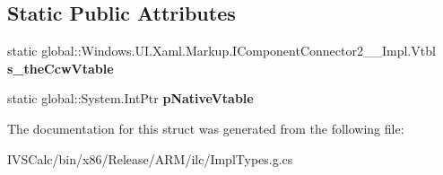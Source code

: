 \subsection*{Static Public Attributes}
\begin{DoxyCompactItemize}
\item 
\mbox{\label{struct_windows_1_1_u_i_1_1_xaml_1_1_markup_1_1_i_component_connector2_____impl_1_1_vtbl_a29b7c24d497a38dc063a75f80cbfee21}} 
static global\+::\+Windows.\+U\+I.\+Xaml.\+Markup.\+I\+Component\+Connector2\+\_\+\+\_\+\+Impl.\+Vtbl {\bfseries s\+\_\+the\+Ccw\+Vtable}
\item 
\mbox{\label{struct_windows_1_1_u_i_1_1_xaml_1_1_markup_1_1_i_component_connector2_____impl_1_1_vtbl_a3771dae4e6127cd08f87dbdcfc4ba30f}} 
static global\+::\+System.\+Int\+Ptr {\bfseries p\+Native\+Vtable}
\end{DoxyCompactItemize}


The documentation for this struct was generated from the following file\+:\begin{DoxyCompactItemize}
\item 
I\+V\+S\+Calc/bin/x86/\+Release/\+A\+R\+M/ilc/Impl\+Types.\+g.\+cs\end{DoxyCompactItemize}
